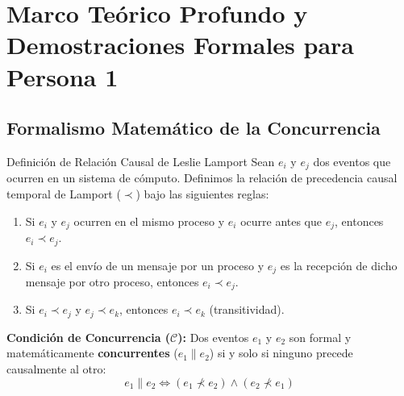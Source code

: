 \documentclass[11pt,a4paper]{article}
\begin{document}
\section{Marco Teórico Profundo y Demostraciones Formales para Persona 1}

\subsection{Formalismo Matemático de la Concurrencia}
\begin{conceptbox}{Definición de Relación Causal de Leslie Lamport}
Sean $e_i$ y $e_j$ dos eventos que ocurren en un sistema de cómputo. Definimos la relación de precedencia causal temporal de Lamport ($\prec$) bajo las siguientes reglas:
\begin{enumerate}[leftmargin=5mm]
    \item Si $e_i$ y $e_j$ ocurren en el mismo proceso y $e_i$ ocurre antes que $e_j$, entonces $e_i \prec e_j$.
    \item Si $e_i$ es el envío de un mensaje por un proceso y $e_j$ es la recepción de dicho mensaje por otro proceso, entonces $e_i \prec e_j$.
    \item Si $e_i \prec e_j$ y $e_j \prec e_k$, entonces $e_i \prec e_k$ (transitividad).
\end{enumerate}
\textbf{Condición de Concurrencia ($\mathcal{C}$):} Dos eventos $e_1$ y $e_2$ son formal y matemáticamente \textbf{concurrentes} ($e_1 \parallel e_2$) si y solo si ninguno precede causalmente al otro:
\[
e_1 \parallel e_2 \iff (e_1 \not\prec e_2) \land (e_2 \not\prec e_1)
\]
\end{conceptbox}
\end{document}
